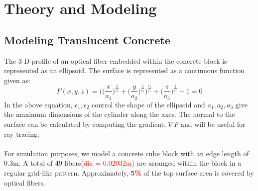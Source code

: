 \documentclass[times, 10pt,a4paper]{article}
\begin{document}
\section{Theory and Modeling}
\subsection{Modeling Translucent Concrete}
The 3-D profile of an optical fiber embedded within the concrete block is represented as an ellipsoid. The surface is represented
as a continuous function given as:
\begin{equation} 
F(x,y,z) = \Bigg(\Bigg(\frac{x}{a_1}\Bigg)^{\frac{2}{\epsilon_2}} +  \Bigg(\frac{y}{a_2}\Bigg)^{\frac{2}{\epsilon_2}} \Bigg)^{\frac{\epsilon_2}{\epsilon_1}} 
+ \Bigg(\frac{z}{a_3}\Bigg)^{\frac{2}{\epsilon_1}} -1 = 0
\end{equation}
In the above equation, ${\epsilon_1, \epsilon_2}$ control the shape of the ellipsoid and 
${a_1, a_2, a_3}$ give the maximum dimensions of the cylinder along the axes. 
The normal to the surface can be calculated by computing the gradient, $\nabla F$ and
will be useful for ray tracing.\\ \\
%
For simulation purposes, we model a concrete cube block with an edge length of 0.3m. A total of 49 fibers\textcolor{red}{(dia = 0.02032m)} are arranged within 
the block in a regular grid-like pattern. Approximately, \textcolor{red}{\textbf{5\%}} of the top surface area is covered by optical fibers. 
\end{document}
